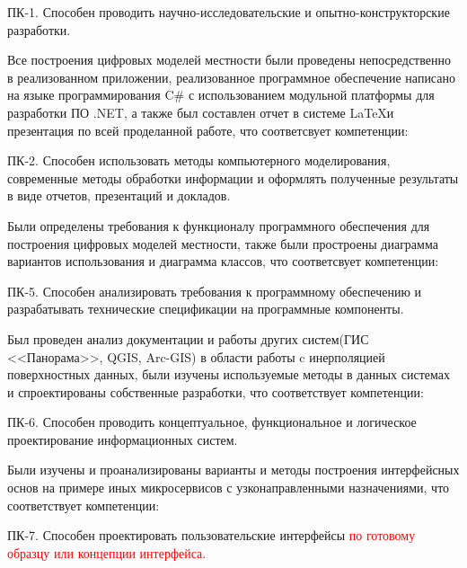 ПК-1. Способен проводить научно-исследовательские и опытно-конструкторские разработки.

Все построения цифровых моделей местности были проведены непосредственно в реализованном приложении, реализованное программное обеспечение написано на языке программирования C\# с использованием модульной платформы для разработки ПО .NET, а также был составлен отчет в системе \LaTeX и презентация по всей проделанной работе, что соответсвует компетенции:

ПК-2. Способен использовать методы компьютерного моделирования, современные методы обработки информации и оформлять полученные результаты в виде отчетов, презентаций и докладов.

Были определены требования к функционалу программного обеспечения для построения цифровых моделей местности, также были простроены диаграмма вариантов использования и диаграмма классов, что соответсвует компетенции:

ПК-5. Способен анализировать требования к программному обеспечению и разрабатывать технические спецификации на программные компоненты.

Был проведен анализ документации и работы других систем(ГИС <<Панорама>>, QGIS, Arc-GIS) в области работы c инерполяцией поверхностных данных, были изучены используемые методы в данных системах и спроектированы собственные разработки, что соответствует компетенции:

ПК-6. Способен проводить концептуальное, функциональное и логическое проектирование информационных систем.

Были изучены и проанализированы варианты и методы построения интерфейсных основ на примере иных микросервисов с узконаправленными назначениями, что соответствует компетенции:

ПК-7. Способен проектировать пользовательские интерфейсы \textcolor{red}{ по готовому образцу или концепции интерфейса}.

